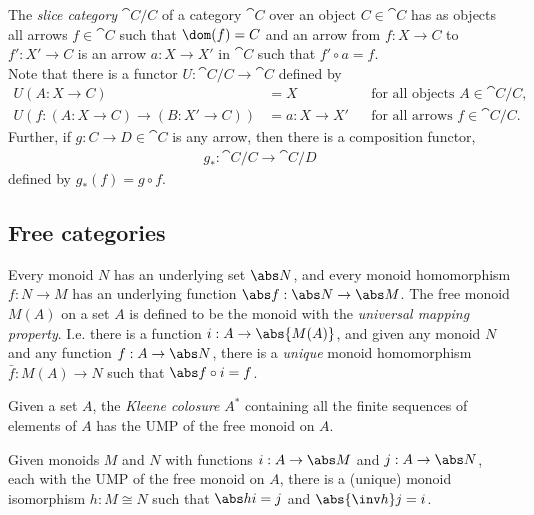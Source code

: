 \documentclass{article}
\begin{document}
\begin{definition}
	The \emph{slice category} $\cat C/C$ of a category $\cat C$ over an
	object $C\in\cat C$ has as objects all arrows $f\in\cat C$ such that
	$\dom(f)=C$ and an arrow from $f:X\to C$ to $f':X'\to C$ is an arrow
	$a:X\to X'$ in $\cat C$ such that $f'\circ a = f$.\\
	Note that there is a functor $U:\cat C/C \to \cat C$ defined by
	\begin{align*}
		U(A:X\to C)                   & = X
		                              &             & \text{for all objects }A\in\cat C/C, \\
		U(f:(A:X\to C)\to(B:X'\to C)) & = a:X\to X'
		                              &             & \text{for all arrows }f\in\cat C/C.
	\end{align*}
	Further, if $g:C\to D\in\cat C$ is any arrow, then there is a composition
	functor,
	\begin{align*}
		g_*:\cat C/C\to\cat C/D
	\end{align*}
	defined by $g_*(f)= g\circ f$.
\end{definition}

\subsection{Free categories}

\begin{definition}[UMP of $M(A)$]
	Every monoid $N$ has an underlying set $\abs N$, and every monoid
	homomorphism $f:N\to M$ has an underlying function $\abs f: \abs N
		\to \abs M$.
	The free monoid $M(A)$ on a set $A$ is defined to be
	the monoid with the \emph{universal mapping property}.
	I.e. there is a function $i:A\to \abs{M(A)}$, and given any
	monoid $N$ and any function $f:A\to\abs N$, there is a
	\emph{unique} monoid homomorphism $\bar f: M(A)\to N$
	such that $\abs f \circ i = f$.
\end{definition}

\begin{proposition}[Awodey 1.9]
	Given a set $A$, the \emph{Kleene colosure} $A^*$ containing
	all the finite sequences of elements of $A$ has the UMP of the
	free monoid on $A$.
\end{proposition}

\begin{proposition}
	Given monoids $M$ and $N$ with functions $i:A\to\abs M$ and
	$j:A\to\abs N$, each with the UMP of the free monoid on $A$,
	there is a (unique) monoid isomorphism $h:M\cong N$ such that
	$\abs h i=j$ and $\abs{\inv h}j = i$.
\end{proposition}
\end{document}
